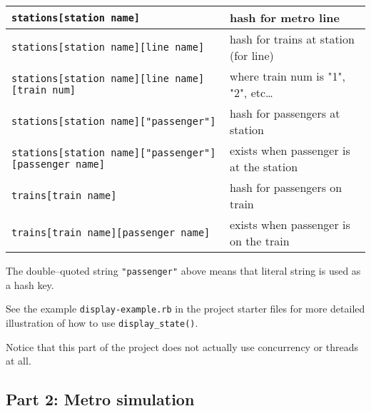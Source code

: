 \documentclass[11pt]{article}
\begin{document}
      \begin{center}

        \begin{tabular}[t]{|l|l|}

          \hline

          \texttt{stations[station name]}
            & hash for metro line
            \\ \hline

          \texttt{stations[station name][line name]}
            & hash for trains at station (for line)
            \\ \hline

          \texttt{stations[station name][line name][train num]}
            & where train num is "1", "2", etc\ldots
            \\ \hline

          \texttt{stations[station name]["passenger"]}
            & hash for passengers at station
            \\ \hline

          \texttt{stations[station name]["passenger"][passenger name]}
            & exists when passenger is at the station
            \\ \hline

          \texttt{trains[train name]}
            & hash for passengers on train
            \\ \hline

          \texttt{trains[train name][passenger name]}
            & exists when passenger is on the train
            \\ \hline

        \end{tabular}

      \end{center}

      \medskip

      The double--quoted string \texttt{"passenger"} above means that
    literal string is used as a hash key.

      See the example \texttt{display-example.rb} in the project starter files
    for more detailed illustration of how to use \texttt{display\_state()}.

      Notice that this part of the project does not actually use concurrency
    or threads at all.

    \subsection{Part 2: Metro simulation}
\end{document}
